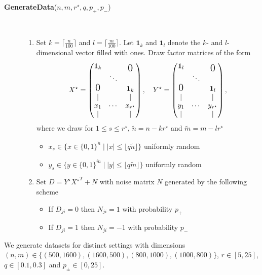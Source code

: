 \begin{description}
\item [\textbf{GenerateData}($n,m,r^\star,q,p_+,p_-$)]\ 
\begin{enumerate}
\item Set $k= \lceil\frac{n}{100}\rceil$ and $l= \lceil\frac{m}{100}\rceil$. Let $\mathbf{1}_k$ and $\mathbf{1}_l$ denote the $k$- and $l$-dimensional vector filled with ones. Draw factor matrices of the form 
\[
X^\star=\begin{pmatrix}
\mathbf{1}_k &  & \raisebox{-1ex}{\text{\Large 0}}\\
&  \ddots &  \\
\text{\Large 0}&  & \mathbf{1}_k\\
\mid & & \mid\\
x_1 &\cdots & x_{r^\star}\\
\mid & & \mid
\end{pmatrix}, \quad
Y^\star=\begin{pmatrix}
\mathbf{1}_l &  & \raisebox{-1ex}{\text{\Large 0}}\\
&  \ddots & \\
\text{\Large 0}& & \mathbf{1}_l\\
\mid & & \mid\\
y_1 &\cdots & y_{r^\star}\\
\mid & & \mid
\end{pmatrix},
\]
where we draw for $1\leq s\leq r^\star$, $\tilde{n}=n-kr^\star$ and $\tilde{m}=m-lr^\star$
\begin{itemize}
\item $x_s\in\{x\in\{0,1\}^{\tilde{n}}\mid |x|\leq \lfloor q\tilde{n}\rfloor\}$ uniformly random 
\item $y_s\in\{y\in\{0,1\}^{\tilde{m}}\mid  |y|\leq \lfloor q\tilde{m}\rfloor\}$ uniformly random
\end{itemize}
\item Set $D=Y^\star {X^\star}^T+N$ with noise matrix $N$ generated by the following scheme
\begin{itemize}
\item If $D_{ji}=0$ then $N_{ji}=1$ with probability $p_+$
\item If $D_{ji}=1$ then $N_{ji}=-1$ with probability $p_-$
\end{itemize}
\end{enumerate}

\end{description}
We generate datasets for distinct settings with dimensions $(n,m)\in\{(500,1600),\allowbreak(1600,500),\allowbreak(800,1000),\allowbreak(1000,800)\}$, $r\in[5,25]$, $q\in [0.1,0.3]$ and $p_\pm\in [0,25]$. 
